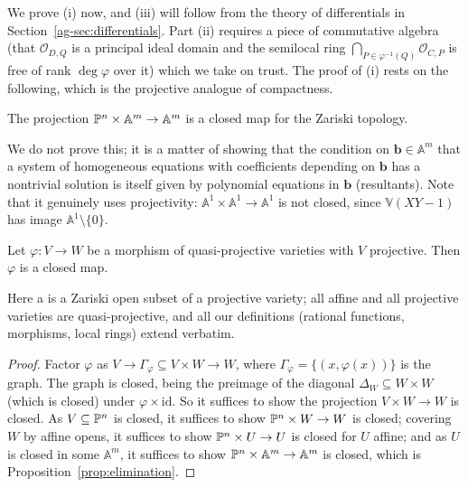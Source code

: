 \documentclass[a4paper]{scrartcl}
\newcommand{\A}{\mathbb{A}}
\newcommand{\V}{\mathbb{V}}
\newcommand{\Oh}{\mathcal{O}}
\begin{document}
We prove (i) now, and (iii) will follow from the theory of differentials in Section~\ref{ag-sec:differentials}. Part (ii) requires a piece of commutative algebra (that $\Oh_{D,Q}$ is a principal ideal domain and the semilocal ring $\bigcap_{P \in \varphi^{-1}(Q)}\Oh_{C,P}$ is free of rank $\deg\varphi$ over it) which we take on trust. The proof of (i) rests on the following, which is the projective analogue of compactness.

\begin{proposition}\label{prop:elimination}
	The projection $\PP^n\times\A^m \to \A^m$ is a closed map for the Zariski topology.
\end{proposition}

We do not prove this; it is a matter of showing that the condition on $\mathbf b \in \A^m$ that a system of homogeneous equations with coefficients depending on $\mathbf b$ has a nontrivial solution is itself given by polynomial equations in $\mathbf b$ (resultants). Note that it genuinely uses projectivity: $\A^1 \times \A^1 \to \A^1$ is not closed, since $\V(XY - 1)$ has image $\A^1\setminus\{0\}$.

\begin{proposition}\label{prop:projclosed}
	Let $\varphi \colon V \to W$ be a morphism of quasi-projective varieties with $V$ projective. Then $\varphi$ is a closed map.
\end{proposition}

Here a  is a Zariski open subset of a projective variety; all affine and all projective varieties are quasi-projective, and all our definitions (rational functions, morphisms, local rings) extend verbatim.

\begin{proof}
	Factor $\varphi$ as $V \to \Gamma_\varphi \subseteq V\times W \to W$, where $\Gamma_\varphi = \{(x,\varphi(x))\}$ is the graph. The graph is closed, being the preimage of the diagonal $\Delta_W \subseteq W\times W$ (which is closed) under $\varphi\times\mathrm{id}$. So it suffices to show the projection $V \times W \to W$ is closed. As $V \subseteq \mathbb{P}^n$ is closed, it suffices to show $\mathbb{P}^n\times W \to W$ is closed; covering $W$ by affine opens, it suffices to show $\mathbb{P}^n\times U \to U$ is closed for $U$ affine; and as $U$ is closed in some $\A^m$, it suffices to show $\PP^n \times \A^m \to \A^m$ is closed, which is Proposition~\ref{prop:elimination}.
\end{proof}
\end{document}
